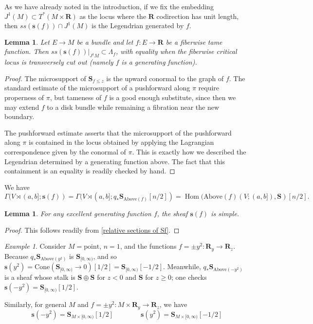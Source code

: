 \documentclass[12pt,a4paper]{article}
\numberwithin{equation}{section}
\newtheorem{lem}[equation]{Lemma}
\newtheorem{lemma}[equation]{Lemma}
\theoremstyle{definition}
\theoremstyle{remark}
\newtheorem{example}[equation]{Example}
\newcommand{\R}{\mathbf{R}}
\newcommand{\s}{\mathbf{s}}
\renewcommand{\S}{\mathbf{S}}
\DeclareMathOperator{\Hom}{Hom}
\begin{document}
As we have already noted in the introduction,  if we fix the embedding $J^1(M) \subset T^*(M \times \R)$ as the locus where the $\R$ codirection has unit length, then
$ss(\s(f)) \cap J^1(M)$ is the Legendrian generated by $f$.
\begin{lem} \cite{Viterbo-introduction} \label{gen fn sheaf support}
    Let $E \to M$ be a bundle and let $f : E \to \R$ be a fiberwise tame function.  Then $ss(\mathbf{s}(f))|_{J^1 M} \subset \Lambda_f$, with equality when the fiberwise critical locus is transversely cut out (namely $f$ is a generating function).
\end{lem}
\begin{proof}
    The microsupport of $\S_{f \le z}$ is the upward conormal to the graph of $f$.
    The standard estimate of the microsupport of a pushforward along $\pi$ require properness of $\pi$, but tameness of $f$ is a good enough substitute, since then we may extend $f$ to a disk bundle while remaining a fibration near the new boundary.

    The pushforward estimate \cite[Prop. 5.4.4]{Kashiwara-Schapira} asserts that the microsupport of the pushforward along $\pi$ is contained in the locus obtained by applying the Lagrangian correspondence given by the conormal of $\pi$.  This is exactly how we described the Legendrian determined by a generating function above.  The fact that this containment is an equality is readily checked by hand.
\end{proof}

We have
\begin{equation}
\label{relative sections of Sf}
\Gamma(V \rtimes (a, b]; \s(f)) =
\Gamma(V \rtimes (a, b]; q_* \S_{\mathrm{Above}(f)}[n/2])
= \Hom(\mathrm{Above}(f)(V; (a, b]), \S)[n/2].
\end{equation}


\begin{lemma}
For any excellent generating function $f$, the sheaf $\s(f)$ is simple.
\end{lemma}
\begin{proof}
    This follows readily from \eqref{relative sections of Sf}.
\end{proof}


\begin{example}
    Consider  $M = \mathrm{point}$, $n=1$, and the functions $f= \pm y^2: \R_y \to \R_z$.  Because $q_* \S_{\mathrm{Above}(y^2)}$ is $\S_{[0, \infty)}$, and so $\s(y^2) = \mathrm{Cone} (\S_{[0, \infty)} \to 0 )[1/2] = \S_{[0, \infty)}[-1/2]$.  Meanwhile, $q_* \S_{\mathrm{Above}(-y^2)}$ is a sheaf whose stalk is $\S \oplus \S$ for $z < 0$ and $\S$ for $z \ge 0$; one checks $\s(-y^2) = \S_{[0, \infty)}[1/2]$.

    Similarly, for general $M$ and $f= \pm y^2: M \times \R_y \to \R_z$, we have
    $$\s(-y^2) = \S_{M \times [0, \infty)}[1/2] \qquad \qquad \s(y^2) = \S_{M \times [0, \infty)}[-1/2]$$
\end{example}
\end{document}
